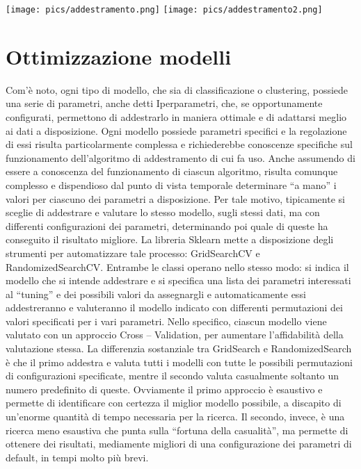 \documentclass[12pt,oneside]{article}
\begin{document}
        \texttt{[image: pics/addestramento.png]}
        \texttt{[image: pics/addestramento2.png]}
      
\section{Ottimizzazione modelli}\label{ott}
    \begin{justify}
        Com’è noto, ogni tipo di modello, che sia di classificazione o clustering, possiede una serie di parametri, anche detti Iperparametri, che, se opportunamente configurati, permettono di addestrarlo in maniera ottimale e di adattarsi meglio ai dati a disposizione. Ogni modello possiede parametri specifici e la regolazione di essi risulta particolarmente complessa e richiederebbe conoscenze specifiche sul funzionamento dell’algoritmo di addestramento di cui fa uso. Anche assumendo di essere a conoscenza del funzionamento di ciascun algoritmo, risulta comunque complesso e dispendioso dal punto di vista temporale determinare “a mano” i valori per ciascuno dei parametri a disposizione. Per tale motivo, tipicamente si sceglie di addestrare e valutare lo stesso modello, sugli stessi dati, ma con differenti configurazioni dei parametri, determinando poi quale di queste ha conseguito il risultato migliore. 
        La libreria Sklearn mette a disposizione degli strumenti per automatizzare tale processo: GridSearchCV e RandomizedSearchCV. Entrambe le classi operano nello stesso modo: si indica il modello che si intende addestrare e si specifica una lista dei parametri interessati al “tuning” e dei possibili valori da assegnargli e automaticamente essi addestreranno e valuteranno il modello indicato con differenti permutazioni dei valori specificati per i vari parametri. Nello specifico, ciascun modello viene valutato con un approccio Cross – Validation, per aumentare l’affidabilità della valutazione stessa. La differenzia sostanziale tra GridSearch e RandomizedSearch è che il primo addestra e valuta tutti i modelli con tutte le possibili permutazioni di configurazioni specificate, mentre il secondo valuta casualmente soltanto un numero predefinito di queste. Ovviamente il primo approccio è esaustivo e permette di identificare con certezza il miglior modello possibile, a discapito di un’enorme quantità di tempo necessaria per la ricerca. Il secondo, invece, è una ricerca meno esaustiva che punta sulla “fortuna della casualità”, ma permette di ottenere dei risultati, mediamente migliori di una configurazione dei parametri di default, in tempi molto più brevi.

\end{justify}
\end{document}

